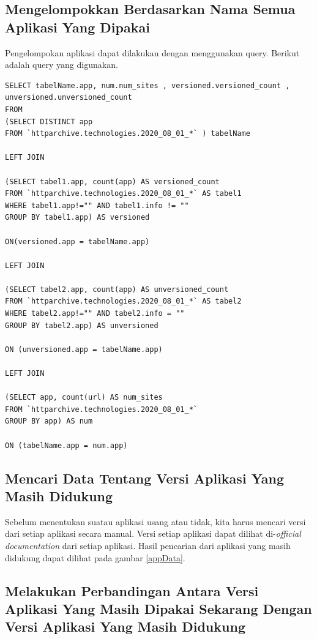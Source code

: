 \subsection{Mengelompokkan Berdasarkan Nama Semua Aplikasi Yang Dipakai}
Pengelompokan aplikasi dapat dilakukan dengan menggunakan query. Berikut adalah query yang digunakan.
\begin{verbatim}
SELECT tabelName.app, num.num_sites , versioned.versioned_count , unversioned.unversioned_count
FROM 
(SELECT DISTINCT app
FROM `httparchive.technologies.2020_08_01_*` ) tabelName

LEFT JOIN 

(SELECT tabel1.app, count(app) AS versioned_count
FROM `httparchive.technologies.2020_08_01_*` AS tabel1
WHERE tabel1.app!="" AND tabel1.info != "" 
GROUP BY tabel1.app) AS versioned

ON(versioned.app = tabelName.app)

LEFT JOIN

(SELECT tabel2.app, count(app) AS unversioned_count
FROM `httparchive.technologies.2020_08_01_*` AS tabel2
WHERE tabel2.app!="" AND tabel2.info = "" 
GROUP BY tabel2.app) AS unversioned

ON (unversioned.app = tabelName.app)

LEFT JOIN 

(SELECT app, count(url) AS num_sites
FROM `httparchive.technologies.2020_08_01_*`
GROUP BY app) AS num

ON (tabelName.app = num.app)
\end{verbatim}

\subsection{Mencari Data Tentang Versi Aplikasi Yang Masih Didukung}
Sebelum menentukan suatau aplikasi usang atau tidak, kita harus mencari versi dari setiap aplikasi secara manual. Versi setiap aplikasi dapat dilihat di-\textit{official documentation} dari setiap aplikasi. Hasil pencarian dari aplikasi yang masih didukung dapat dilihat pada gambar \ref{appData}. 

\subsection{Melakukan Perbandingan Antara Versi Aplikasi Yang Masih Dipakai Sekarang Dengan Versi Aplikasi Yang Masih Didukung}




